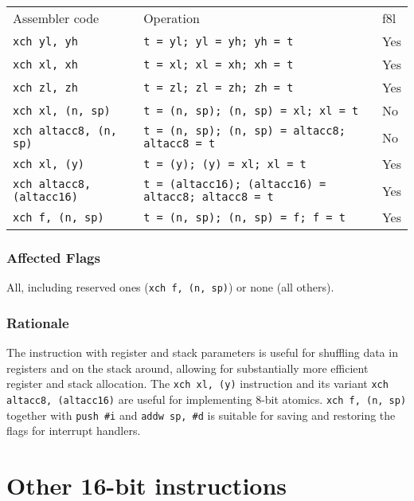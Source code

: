 \documentclass{book}
\begin{document}
\begin{tabular}{l l l}
Assembler code                   & Operation                                                  & f8l \\
\texttt{xch yl, yh}              & \texttt{t = yl; yl = yh; yh = t}                           & Yes \\
\texttt{xch xl, xh}              & \texttt{t = xl; xl = xh; xh = t}                           & Yes \\
\texttt{xch zl, zh}              & \texttt{t = zl; zl = zh; zh = t}                           & Yes \\
\texttt{xch xl, (n, sp)}         & \texttt{t = (n, sp); (n, sp) = xl; xl = t}                 & No \\
\texttt{xch altacc8, (n, sp)}    & \texttt{t = (n, sp); (n, sp) = altacc8; altacc8 = t}       & No \\
\texttt{xch xl, (y)}             & \texttt{t = (y); (y) = xl; xl = t}                         & Yes \\
\texttt{xch altacc8, (altacc16)} & \texttt{t = (altacc16); (altacc16) = altacc8; altacc8 = t} & Yes \\
\texttt{xch f, (n, sp)}          & \texttt{t = (n, sp); (n, sp) = f; f = t}                   & Yes
\end{tabular}

\subsubsection*{Affected Flags}

All, including reserved ones (\texttt{xch f, (n, sp)}) or none (all others).

\subsubsection*{Rationale}

The instruction with register and stack parameters is useful for shuffling data in registers and on the stack around, allowing for substantially more efficient register and stack allocation. The \texttt{xch xl, (y)} instruction and its variant \texttt{xch altacc8, (altacc16)} are useful for implementing 8-bit atomics. \texttt{xch f, (n, sp)} together with \texttt{push \#i} and \texttt{addw sp, \#d} is suitable for saving and restoring the flags for interrupt handlers.


\section{Other 16-bit instructions}
\end{document}
